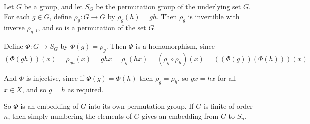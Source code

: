 \documentclass[12pt]{article}
\begin{document}
Let $G$ be a group, and let $S_G$ be the permutation group of the underlying set $G$.  For each $g\in G$, define $\rho_g : G\rightarrow G$ by $\rho_g (h) = gh$.  Then $\rho_g$ is invertible with inverse $\rho_{g^{-1}}$, and so is a permutation of the set $G$.

Define $\Phi :G\rightarrow S_G$ by $\Phi (g) = \rho_g$.  Then $\Phi$ is a homomorphism, since $$(\Phi (gh))(x) = \rho_{gh}(x) = ghx = \rho_g(hx) = (\rho_g\circ\rho_h)(x) = ((\Phi (g))(\Phi (h)))(x)$$

And $\Phi$ is injective, since if $\Phi (g) = \Phi (h)$ then $\rho_g = \rho_h$, so $gx = hx$ for all $x\in X$, and so $g=h$ as required.

So $\Phi$ is an embedding of $G$ into its own permutation group.  If $G$ is finite of order $n$, then simply numbering the elements of $G$ gives an embedding from $G$ to $S_n$.
\end{document}
